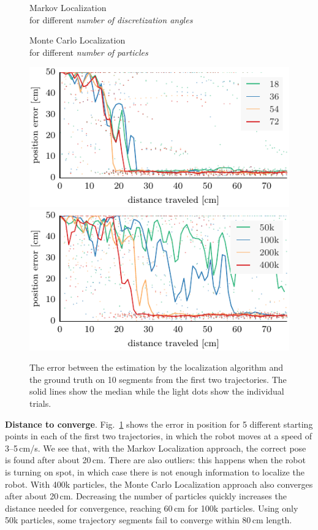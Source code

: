 \documentclass{svmult}
\newcommand{\Fig}[1]{Fig.~\ref{fig:#1}}
\begin{document}
\begin{figure}

\begin{minipage}{.5\columnwidth}
\begin{center}
Markov Localization\\for different \emph{number of discretization angles}
\end{center}
\end{minipage}
\hfill
\begin{minipage}{.5\columnwidth}
\begin{center}
Monte Carlo Localization\\for different \emph{number of particles}
\end{center}
\end{minipage}

\includegraphics[width=.5\columnwidth]{ml-small_runs_random_12-xy}
\includegraphics[width=.5\columnwidth]{mcl-small_runs_random_12-xy}

\caption{%
The error between the estimation by the localization algorithm and the ground truth on 10 segments from the first two trajectories.
The solid lines show the median while the light dots show the individual trials.}
\label{fig:small-runs}
\end{figure}

\textbf{Distance to converge}.
\Fig{small-runs} shows the error in position for 5 different starting points in each of the first two trajectories, in which the robot moves at a speed of 3--5\,cm/s.
We see that, with the Markov Localization approach, the correct pose is found after about 20\,cm.
There are also outliers: this happens when the robot is turning on spot, in which case there is not enough information to localize the robot.
With 400k particles, the Monte Carlo Localization approach also converges after about 20\,cm.
Decreasing the number of particles quickly increases the distance needed for convergence, reaching 60\,cm for 100k particles.
Using only 50k particles, some trajectory segments fail to converge within 80\,cm length.
\end{document}
